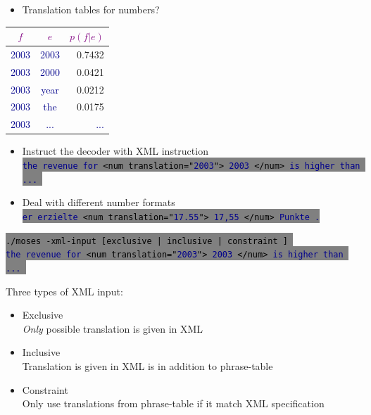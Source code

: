 \documentclass[landscape]{uedslides2C}
\newcommand{\example}[1]{\textcolor{darkblue}{\rm #1}}
\newcommand{\maths}[1]{\textcolor{purple}{#1}}
\newcommand{\littlecode}[1]{\colorbox{gray}{\textcolor{black}{\small \tt #1}}}
\begin{document}

\begin{itemize}
\item Translation tables for numbers?
\end{itemize}
\begin{center} \begin{tabular}{c|c|r}
\maths{$f$} & \maths{$e$} & \maths{$p(f|e)$} \\ \hline
\example{2003} & \example{2003} & 0.7432 \\ \hline
\example{2003} & \example{2000} & 0.0421 \\ \hline
\example{2003} & \example{year} & 0.0212 \\ \hline
\example{2003} & \example{the} & 0.0175 \\ \hline
\example{2003} & \example{...} & \example{...} \\ \hline
\end{tabular} \end{center}
\begin{itemize}
\item Instruct the decoder with XML instruction\\[2mm]
\littlecode{\example{the revenue for} <num translation="\example{2003}"> \example{2003}
  </num> \example{is higher than ...} }
\item Deal with different number formats\\[2mm]
\littlecode{\example{er erzielte} <num translation="\example{17.55}"> \example{17,55} </num> \example{Punkte .}}
\end{itemize}



\littlecode{./moses -xml-input [exclusive | inclusive | constraint ] }
\\
\littlecode{\example{the revenue for} <num translation="\example{2003}"> \example{2003}
  </num> \example{is higher than ...} }

\vspace{1cm}
Three types of XML input:
\vspace{-2mm}
\begin{itemize} \itemsep -2mm 
  \item Exclusive \\
    \emph{Only} possible translation is given in XML 
  \item Inclusive \\
  Translation is given in XML is in addition to phrase-table
  \item Constraint \\
  Only use translations from phrase-table if it match XML specification
\end{itemize}
\end{document}
